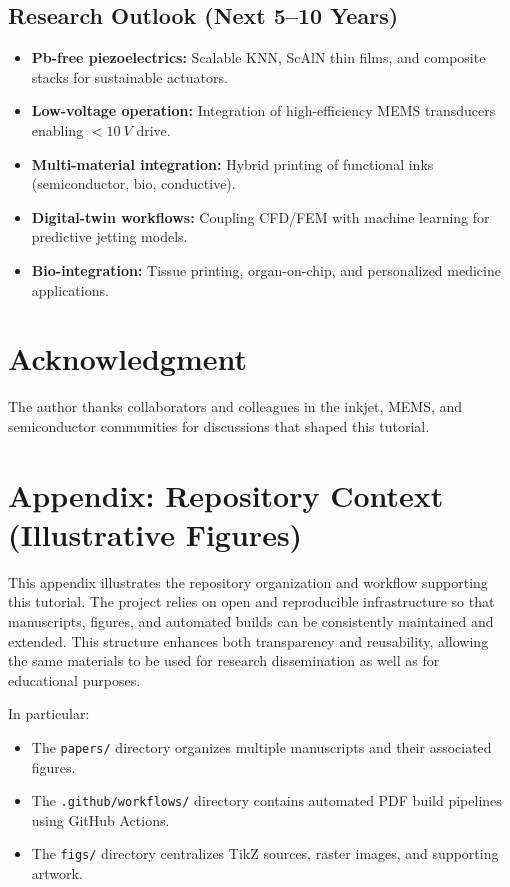 \documentclass[conference]{IEEEtran}
\begin{document}
\subsection*{Research Outlook (Next 5--10 Years)}
\begin{itemize}
  \item \textbf{Pb-free piezoelectrics:} Scalable KNN, ScAlN thin films, and composite stacks for sustainable actuators.
  \item \textbf{Low-voltage operation:} Integration of high-efficiency MEMS transducers enabling $<\SI{10}{V}$ drive.
  \item \textbf{Multi-material integration:} Hybrid printing of functional inks (semiconductor, bio, conductive).
  \item \textbf{Digital-twin workflows:} Coupling CFD/FEM with machine learning for predictive jetting models.
  \item \textbf{Bio-integration:} Tissue printing, organ-on-chip, and personalized medicine applications.
\end{itemize}

\section*{Acknowledgment}
The author thanks collaborators and colleagues in the inkjet, MEMS, and semiconductor communities for discussions that shaped this tutorial.

\section*{Appendix: Repository Context (Illustrative Figures)}

This appendix illustrates the repository organization and workflow 
supporting this tutorial. The project relies on open and reproducible 
infrastructure so that manuscripts, figures, and automated builds can 
be consistently maintained and extended. This structure enhances both 
transparency and reusability, allowing the same materials to be used for 
research dissemination as well as for educational purposes.

In particular:
\begin{itemize}
  \item The \texttt{papers/} directory organizes multiple manuscripts and 
        their associated figures.
  \item The \texttt{.github/workflows/} directory contains automated 
        PDF build pipelines using GitHub Actions.
  \item The \texttt{figs/} directory centralizes TikZ sources, raster 
        images, and supporting artwork.
\end{itemize}
\end{document}
